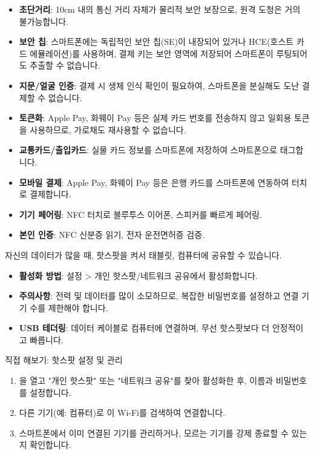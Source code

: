 \begin{itemize}
  \item \textbf{초단거리}: 10cm 내의 통신 거리 자체가 물리적 보안 보장으로, 원격 도청은 거의 불가능합니다.
  \item \textbf{보안 칩}: 스마트폰에는 독립적인 보안 칩(SE)이 내장되어 있거나 HCE(호스트 카드 에뮬레이션)를 사용하며, 결제 키는 보안 영역에 저장되어 스마트폰이 루팅되어도 추출할 수 없습니다.
  \item \textbf{지문/얼굴 인증}: 결제 시 생체 인식 확인이 필요하여, 스마트폰을 분실해도 도난 결제할 수 없습니다.
  \item \textbf{토큰화}: Apple Pay, 화웨이 Pay 등은 실제 카드 번호를 전송하지 않고 일회용 토큰을 사용하므로, 가로채도 재사용할 수 없습니다.
\end{itemize}


\begin{itemize}
  \item \textbf{교통카드/출입카드}: 실물 카드 정보를 스마트폰에 저장하여 스마트폰으로 태그합니다.
  \item \textbf{모바일 결제}: Apple Pay, 화웨이 Pay 등은 은행 카드를 스마트폰에 연동하여 터치로 결제합니다.
  \item \textbf{기기 페어링}: NFC 터치로 블루투스 이어폰, 스피커를 빠르게 페어링.
  \item \textbf{본인 인증}: NFC 신분증 읽기, 전자 운전면허증 검증.
\end{itemize}


자신의 데이터가 많을 때, 핫스팟을 켜서 태블릿, 컴퓨터에 공유할 수 있습니다.

\begin{itemize}
  \item \textbf{활성화 방법}: 설정 > 개인 핫스팟/네트워크 공유에서 활성화합니다.
  \item \textbf{주의사항}: 전력 및 데이터를 많이 소모하므로, 복잡한 비밀번호를 설정하고 연결 기기 수를 제한해야 합니다.
  \item \textbf{USB 테더링}: 데이터 케이블로 컴퓨터에 연결하며, 무선 핫스팟보다 더 안정적이고 빠릅니다.
\end{itemize}

\begin{tcbpractice}{직접 해보기: 핫스팟 설정 및 관리}
\begin{enumerate}
  \item [설정]을 열고 "개인 핫스팟" 또는 "네트워크 공유"를 찾아 활성화한 후, 이름과 비밀번호를 설정합니다.
  \item 다른 기기(예: 컴퓨터)로 이 Wi-Fi를 검색하여 연결합니다.
  \item 스마트폰에서 이미 연결된 기기를 관리하거나, 모르는 기기를 강제 종료할 수 있는지 확인합니다.
\end{enumerate}

\end{tcbpractice}
